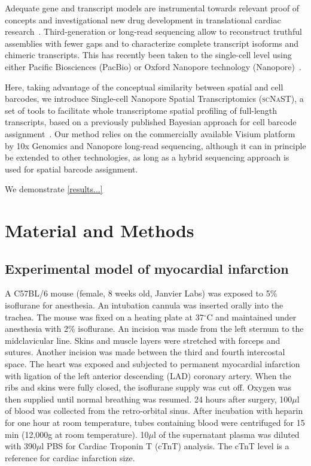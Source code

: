 \documentclass[utf8]{FrontiersinHarvard} %
\newcommand{\scnast}{\textsc{scNaST}\xspace}
\begin{document}
Adequate gene and transcript models are instrumental towards relevant proof of concepts and investigational new drug development in translational cardiac research~\citep{Muller2021:pig_transcriptome}. 
Third-generation or long-read sequencing allow to reconstruct truthful assemblies with fewer gaps and to characterize complete transcript isoforms and chimeric transcripts.
This has recently been taken to the single-cell level using either Pacific Biosciences (PacBio) or Oxford Nanopore technology (Nanopore)~\citep{Gupta2018:ScISOr-Seq,Lebrigand2020:sicelore,Volden2020:R2C2_10x,Wang2021:scnapbar,Joglekar2021:spatial_brain}.

Here, taking advantage of the conceptual similarity between spatial and cell barcodes, we introduce Single-cell Nanopore Spatial Transcriptomics (\scnast), a set of tools to facilitate whole transcriptome spatial profiling of full-length transcripts, based on a previously published Bayesian approach for cell barcode assignment~\citep{Wang2021:scnapbar}. Our method relies on the commercially available Visium platform by 10x Genomics and Nanopore long-read sequencing, although it can in principle be extended to other technologies, as long as a hybrid sequencing approach is used for spatial barcode assignment. 

We demonstrate \ref{results...}


\section*{Material and Methods}

\subsection*{Experimental model of myocardial infarction}
A C57BL/6 mouse (female, 8 weeks old, Janvier Labs) was exposed to 5\% isoflurane for anesthesia. An intubation cannula was inserted orally into the trachea. The mouse was fixed on a heating plate at 37$^\circ$C and maintained under anesthesia with 2\% isoflurane. An incision was made from the left sternum to the midclavicular line. Skins and muscle layers were stretched with forceps and sutures. Another incision was made between the third and fourth intercostal space. The heart was exposed and subjected to permanent myocardial infarction with ligation of the left anterior descending (LAD) coronary artery. When the ribs and skins were fully closed, the isoflurane supply was cut off. Oxygen was then supplied until normal breathing was resumed. 24 hours after surgery, 100$\mu$l of blood was collected from the retro-orbital sinus. After incubation with heparin for one hour at room temperature, tubes containing blood were centrifuged for 15 min (12,000g at room temperature). 10$\mu$l of the supernatant plasma was diluted with 390$\mu$l PBS for Cardiac Troponin T (cTnT) analysis. The cTnT level is a reference for cardiac infarction size.
\end{document}
